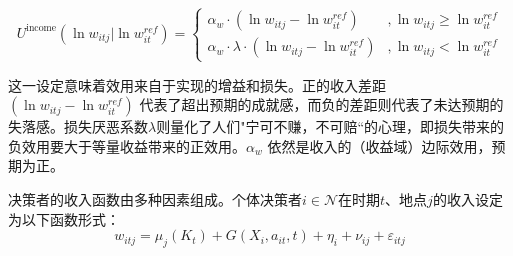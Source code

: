 \documentclass[
  a4paper,
  zihao=-4,
  fontset=mac,
  AutoFakeBold,
  AutoFakeSlant,
  oneside]{ctexbook}
\begin{document}
\begin{equation}
U^{\text{income}}(\ln w_{itj} | \ln w_{it}^{ref}) =
\begin{cases}
\alpha_w \cdot (\ln w_{itj} - \ln w_{it}^{ref}) &, \ln w_{itj} \ge \ln w_{it}^{ref}\\
\alpha_w \cdot \lambda \cdot (\ln w_{itj} - \ln w_{it}^{ref}) &, \ln w_{itj} < \ln w_{it}^{ref}
\end{cases}
\label{eq:收入效用函数}
\end{equation}

这一设定意味着效用来自于实现的增益和损失。正的收入差距 $(\ln w_{itj} - \ln w_{it}^{ref})$ 代表了超出预期的成就感，而负的差距则代表了未达预期的失落感。损失厌恶系数$\lambda$则量化了人们"宁可不赚，不可赔“的心理，即损失带来的负效用要大于等量收益带来的正效用。$\alpha_w$ 依然是收入的（收益域）边际效用，预期为正。


决策者的收入函数由多种因素组成。个体决策者$i \in \mathcal{N}$在时期$t$、地点$j$的收入设定为以下函数形式：
\begin{equation}
    w_{itj}=\mu_j(K_t)+G(X_i, a_{it}, t)+\eta_i+\nu_{ij}+\varepsilon_{itj}
  \label{eq:收入函数}
\end{equation}
\end{document}

